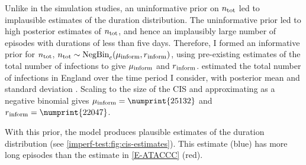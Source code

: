 \documentclass[thesis.tex]{subfiles}
\begin{document}
Unlike in the simulation studies, an uninformative prior on $n_\text{tot}$ led to implausible estimates of the duration distribution.
The uninformative prior led to high posterior estimates of $n_\text{tot}$, and hence an implausibly large number of episodes with durations of less than five days.
Therefore, I formed an informative prior for $n_\text{tot}$, $n_\text{tot} \sim \operatorname{NegBin}_{c}(\mu{_{\text{inform}}}, r{_{\text{inform}}})$, using pre-existing estimates of the total number of infections to give $\mu{_{\text{inform}}}$ and $r{_{\text{inform}}}$.
\Textcite{birrellRTM2} estimated the total number of infections in England over the time period I consider, with posterior mean  and standard deviation .
Scaling to the size of the CIS and approximating as a negative binomial gives $\mu\inform = \numprint{25132}$ and $r\inform = \numprint{22047}$.

With this prior, the model produces plausible estimates of the duration distribution (see \cref{imperf-test:fig:cis-estimates}).
This estimate (blue) has more long episodes than the estimate in \cref{E-ATACCC} (red).
\end{document}
